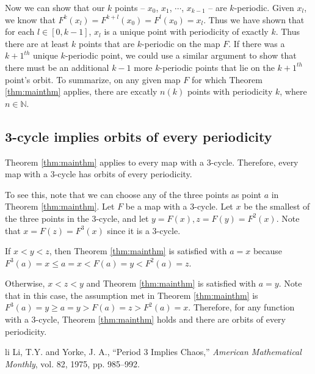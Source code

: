 \documentclass[12pt]{IEEEtran}
\begin{document}
Now we can show that our $k$ points -- $x_0$, $x_1$, $\cdots$, $x_{k-1}$ -- are $k$-periodic. Given $x_l$, we know that $F^k \left( x_l \right) = F^{k+l} \left ( x_0 \right) = F^{l} \left ( x_0 \right) = x_l$. Thus we have shown that for each $l \in [0,k-1]$, $x_l$ is a unique point with periodicity of exactly $k$. Thus there are at least $k$ points that are $k$-periodic on the map $F$. If there was a $k+1^{th}$ unique $k$-periodic point, we could use a similar argument to show that there must be an additional $k-1$ more $k$-periodic points that lie on the $k+1^{th}$ point's orbit. To summarize, on any given map $F$ for which Theorem \ref{thm:mainthm} applies, there are excatly $n \left( k \right)$ points with periodicity $k$, where $n \in \mathbb{N}$.



\subsection{ 3-cycle implies orbits of every periodicity}
Theorem \ref{thm:mainthm} applies to every map with a 3-cycle. Therefore, every map with a 3-cycle has orbits of every periodicity.

To see this, note that we can choose any of the three points as point $a$ in Theorem \ref{thm:mainthm}. Let $F$ be a map with a 3-cycle. Let $x$ be the smallest of the three points in the 3-cycle, and let $y = F \left( x \right), z = F \left( y \right) = F^2 \left( x \right)$. Note that $x = F \left( z \right) = F^3 \left( x \right)$ since it is a 3-cycle.

If $ x < y < z$, then Theorem \ref{thm:mainthm} is satisfied with $a=x$ because $F^3\left(a\right)=x \leq a=x < F\left(a\right)=y < F^2\left(a\right)=z$.

Otherwise, $x < z < y$ and Theorem \ref{thm:mainthm} is satisfied with $a=y$. Note that in this case, the assumption met in Theorem \ref{thm:mainthm} is $F^3\left(a\right)=y \geq a=y > F\left(a\right)=z > F^2\left(a\right)=x$. Therefore, for any function with a 3-cycle, Theorem \ref{thm:mainthm} holds and there are orbits of every periodicity.





\begin{thebibliography}{1}
	\item {li} Li, T.Y. and Yorke, J. A., 
		``Period 3 Implies Chaos,''
		{\it American Mathematical Monthly}, 
		vol. 82, 1975, pp. 985–992.
\end{thebibliography}
\end{document}

